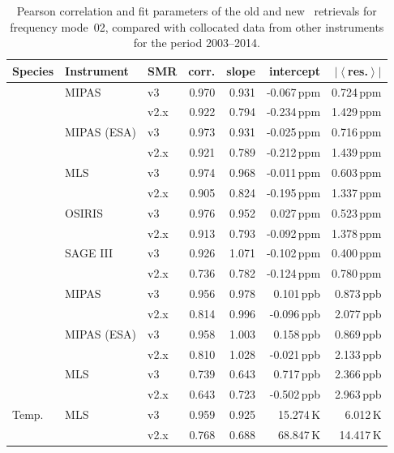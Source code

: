\begin{table}[tbhp]
\centering
\caption{Pearson correlation and fit parameters of the old and new \smr\
retrievals for frequency mode~02, compared with collocated data from other
instruments for the period 2003--2014.
}
\label{tab:fm02:stats}
\begin{tabular}{lllrrrr}
    \toprule
    \textbf{Species} & \textbf{Instrument} & \textbf{SMR} & \textbf{corr.} & \textbf{slope} & \textbf{intercept} & \textbf{$\left|\left<\right.\right.$res.$\left.\left.\right>\right|$} \\
    \midrule
    \chem{O3}       & MIPAS         & v3    & 0.970 & 0.931 & -0.067\,ppm   & 0.724\,ppm \\
                    &               & v2.x  & 0.922 & 0.794 & -0.234\,ppm   & 1.429\,ppm \\
    \cline{2-7}
                    & MIPAS (ESA)   & v3    & 0.973 & 0.931 & -0.025\,ppm   & 0.716\,ppm \\
                    &               & v2.x  & 0.921 & 0.789 & -0.212\,ppm   & 1.439\,ppm \\
    \cline{2-7}
                    & MLS           & v3    & 0.974 & 0.968 & -0.011\,ppm   & 0.603\,ppm \\
                    &               & v2.x  & 0.905 & 0.824 & -0.195\,ppm   & 1.337\,ppm \\
    \cline{2-7}
                    & OSIRIS        & v3    & 0.976 & 0.952 & 0.027\,ppm    & 0.523\,ppm \\
                    &               & v2.x  & 0.913 & 0.793 & -0.092\,ppm   & 1.378\,ppm \\
    \cline{2-7}
                    & SAGE III      & v3    & 0.926 & 1.071 & -0.102\,ppm   & 0.400\,ppm \\
                    &               & v2.x  & 0.736 & 0.782 & -0.124\,ppm   & 0.780\,ppm \\
    \midrule
    \chem{HNO_3}    & MIPAS         & v3    & 0.956 & 0.978 & 0.101\,ppb    & 0.873\,ppb \\
                    &               & v2.x  & 0.814 & 0.996 & -0.096\,ppb   & 2.077\,ppb \\
    \cline{2-7}
                    & MIPAS (ESA)   & v3    & 0.958 & 1.003 & 0.158\,ppb    & 0.869\,ppb \\
                    &               & v2.x  & 0.810 & 1.028 & -0.021\,ppb   & 2.133\,ppb \\
    \cline{2-7}
                    & MLS           & v3    & 0.739 & 0.643 & 0.717\,ppb    & 2.366\,ppb \\
                    &               & v2.x  & 0.643 & 0.723 & -0.502\,ppb   & 2.963\,ppb \\
    \midrule
    Temp.           & MLS           & v3    & 0.959 & 0.925 & 15.274\,K     &  6.012\,K \\
                    &               & v2.x  & 0.768 & 0.688 & 68.847\,K     & 14.417\,K \\
    \bottomrule
\end{tabular}
\end{table}

